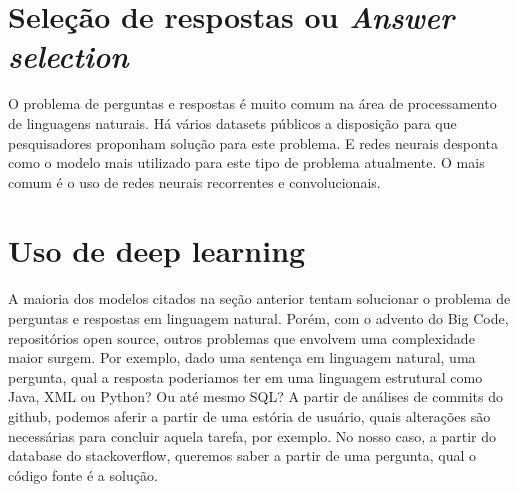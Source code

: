 \section{Seleção de respostas ou \textit{Answer selection}}
\label{sec:answer-selection}

O problema de perguntas e respostas é muito comum na área de processamento de linguagens naturais. Há vários datasets públicos a disposição para que pesquisadores proponham solução para este problema. E redes neurais desponta como o modelo mais utilizado para este tipo de problema atualmente. O mais comum é o uso de redes neurais recorrentes e convolucionais. 


\section{Uso de deep learning}
\label{sec:uso-deep-learning}

A maioria dos modelos citados na seção anterior tentam solucionar o problema de perguntas e respostas em linguagem natural. Porém, com o advento do Big Code, repositórios open source, outros problemas que envolvem uma complexidade maior surgem. Por exemplo, dado uma sentença em linguagem natural, uma pergunta, qual a resposta poderiamos ter em uma linguagem estrutural como Java, XML ou Python? Ou até mesmo SQL? A partir de análises de commits do github, podemos aferir a partir de uma estória de usuário, quais alterações são necessárias para concluir aquela tarefa, por exemplo. No nosso caso, a partir do database do stackoverflow, queremos saber a partir de uma pergunta, qual o código fonte é a solução.